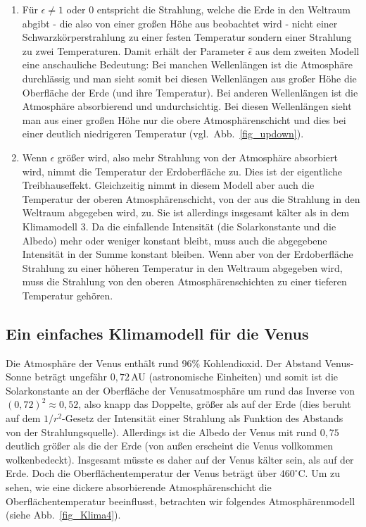 \begin{enumerate}
\item
F\"ur $\epsilon \neq 1$ oder 0 entspricht die Strahlung, welche die Erde in den Weltraum
abgibt - die also von einer gro\ss en H\"ohe aus beobachtet wird - nicht einer
Schwarzk\"orperstrahlung zu einer festen Temperatur sondern einer Strahlung zu zwei
Temperaturen. Damit erh\"alt der Parameter $\hat{\epsilon}$ aus dem zweiten Modell eine
anschauliche Bedeutung: Bei manchen
Wellenl\"angen ist die Atmosph\"are durchl\"assig und man sieht somit bei diesen Wellenl\"angen aus 
gro\ss er H\"ohe die Oberfl\"ache der Erde (und ihre Temperatur). Bei anderen
Wellenl\"angen ist die Atmosph\"are absorbierend und undurchsichtig. Bei diesen Wellenl\"angen
sieht man aus einer gro\ss en H\"ohe nur die obere Atmosph\"arenschicht und dies bei einer
deutlich niedrigeren Temperatur (vgl.\ Abb.\ \ref{fig_updown}).
\item
Wenn $\epsilon$ gr\"o\ss er wird, also mehr Strahlung von der Atmosph\"are absorbiert wird,
nimmt die Temperatur der Erdoberfl\"ache zu. Dies ist der eigentliche Treibhauseffekt. 
Gleichzeitig nimmt in diesem Modell aber auch die Temperatur der oberen Atmosph\"arenschicht, von der
aus die Strahlung in den Weltraum abgegeben wird, zu. Sie ist allerdings insgesamt k\"alter
als in dem Klimamodell 3. Da die einfallende Intensit\"at
(die Solarkonstante und die Albedo) mehr oder weniger konstant bleibt, muss auch die
abgegebene Intensit\"at in der Summe konstant bleiben. Wenn aber von der Erdoberfl\"ache
Strahlung zu einer h\"oheren Temperatur in den Weltraum abgegeben wird, muss die Strahlung
von den oberen Atmosph\"arenschichten zu einer tieferen Temperatur geh\"oren.
\end{enumerate} 

\subsection{Ein einfaches Klimamodell f\"ur die Venus}

Die Atmosph\"are der Venus enth\"alt rund 96\% Kohlendioxid. Der Abstand Venus-Sonne
betr\"agt ungef\"ahr $0,72$\,AU (astronomische Einheiten) und somit ist die Solarkonstante
an der Oberfl\"ache der Venusatmosph\"are um rund das Inverse von $(0,72)^2 \approx 0,52$,
also knapp das Doppelte, gr\"o\ss er als 
auf der Erde (dies beruht auf dem $1/r^2$-Gesetz der Intensit\"at einer Strahlung als Funktion des
Abstands von der Strahlungsquelle). Allerdings ist die Albedo der Venus mit rund $0,75$ deutlich gr\"o\ss er als die
der Erde (von au\ss en erscheint die Venus vollkommen wolkenbedeckt). 
Insgesamt m\"usste es daher auf der Venus k\"alter sein, als auf der Erde. 
Doch die Oberfl\"achentemperatur der Venus betr\"agt \"uber $460^\circ$C. Um zu sehen, wie
eine dickere absorbierende Atmosph\"arenschicht die Oberfl\"achentemperatur beeinflusst,
betrachten wir folgendes Atmosph\"arenmodell (siehe Abb.\ \ref{fig_Klima4}). 

